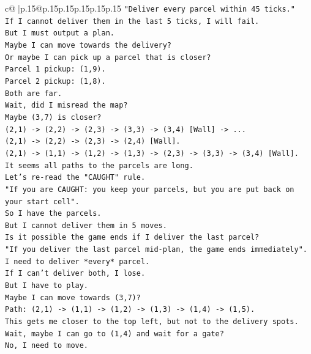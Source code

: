 \documentclass{article}
\begin{document}
{\begin{supertabular}{c@{$\;$}|p{.15\linewidth}@{}p{.15\linewidth}p{.15\linewidth}p{.15\linewidth}p{.15\linewidth}p{.15\linewidth}}
{{{\texttt{"Deliver every parcel within 45 ticks."} \\
\texttt{If I cannot deliver them in the last 5 ticks, I will fail.} \\
\texttt{But I must output a plan.} \\
\texttt{Maybe I can move towards the delivery?} \\
\texttt{Or maybe I can pick up a parcel that is closer?} \\
\texttt{Parcel 1 pickup: (1,9).} \\
\texttt{Parcel 2 pickup: (1,8).} \\
\texttt{Both are far.} \\
\texttt{Wait, did I misread the map?} \\
\texttt{Maybe (3,7) is closer?} \\
\texttt{(2,1) {-}> (2,2) {-}> (2,3) {-}> (3,3) {-}> (3,4) {[}Wall{]} {-}> ...} \\
\texttt{(2,1) {-}> (2,2) {-}> (2,3) {-}> (2,4) {[}Wall{]}.} \\
\texttt{(2,1) {-}> (1,1) {-}> (1,2) {-}> (1,3) {-}> (2,3) {-}> (3,3) {-}> (3,4) {[}Wall{]}.} \\
\texttt{It seems all paths to the parcels are long.} \\
\texttt{Let's re{-}read the "CAUGHT" rule.} \\
\texttt{"If you are CAUGHT: you keep your parcels, but you are put back on your start cell".} \\
\texttt{So I have the parcels.} \\
\texttt{But I cannot deliver them in 5 moves.} \\
\texttt{Is it possible the game ends if I deliver the last parcel?} \\
\texttt{"If you deliver the last parcel mid{-}plan, the game ends immediately".} \\
\texttt{I need to deliver *every* parcel.} \\
\texttt{If I can't deliver both, I lose.} \\
\texttt{But I have to play.} \\
\texttt{Maybe I can move towards (3,7)?} \\
\texttt{Path: (2,1) {-}> (1,1) {-}> (1,2) {-}> (1,3) {-}> (1,4) {-}> (1,5).} \\
\texttt{This gets me closer to the top left, but not to the delivery spots.} \\
\texttt{Wait, maybe I can go to (1,4) and wait for a gate?} \\
\texttt{No, I need to move.} \\
}}}
\end{supertabular}}
\end{document}
